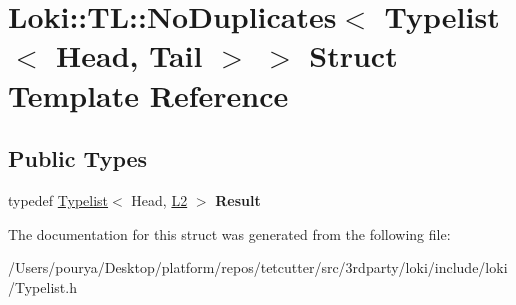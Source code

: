 \hypertarget{structLoki_1_1TL_1_1NoDuplicates_3_01Typelist_3_01Head_00_01Tail_01_4_01_4}{}\section{Loki\+:\+:T\+L\+:\+:No\+Duplicates$<$ Typelist$<$ Head, Tail $>$ $>$ Struct Template Reference}
\label{structLoki_1_1TL_1_1NoDuplicates_3_01Typelist_3_01Head_00_01Tail_01_4_01_4}
\subsection*{Public Types}
\begin{DoxyCompactItemize}
\item 
\hypertarget{structLoki_1_1TL_1_1NoDuplicates_3_01Typelist_3_01Head_00_01Tail_01_4_01_4_a6476bdceb1f95596a8f99219699c4793}{}typedef \hyperlink{structLoki_1_1Typelist}{Typelist}$<$ Head, \hyperlink{structL2}{L2} $>$ {\bfseries Result}\label{structLoki_1_1TL_1_1NoDuplicates_3_01Typelist_3_01Head_00_01Tail_01_4_01_4_a6476bdceb1f95596a8f99219699c4793}

\end{DoxyCompactItemize}


The documentation for this struct was generated from the following file\+:\begin{DoxyCompactItemize}
\item 
/\+Users/pourya/\+Desktop/platform/repos/tetcutter/src/3rdparty/loki/include/loki/Typelist.\+h\end{DoxyCompactItemize}

